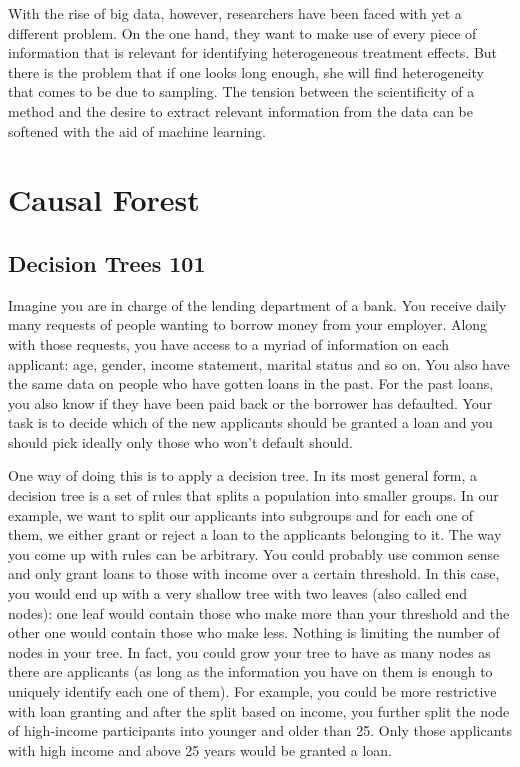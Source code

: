 With the rise of big data, however, researchers have been faced with yet a different problem. On the one hand, they want to make use of every piece of information that is relevant for identifying heterogeneous treatment effects. But there is the problem that if one looks long enough, she will find heterogeneity that comes to be due to sampling. The tension between the scientificity of a method and the desire to extract relevant information from the data can be softened with the aid of machine learning.

\newpage

\section{Causal Forest}

\subsection{Decision Trees 101}

Imagine you are in charge of the lending department of a bank. You receive daily many requests of people wanting to borrow money from your employer. Along with those requests, you have access to a myriad of information on each applicant: age, gender, income statement, marital status and so on. You also have the same data on people who have gotten loans in the past. For the past loans, you also know if they have been paid back or the borrower has defaulted. Your task is to decide which of the new applicants should be granted a loan and you should pick ideally only those who won't default should.

One way of doing this is to apply a decision tree. In its most general form, a decision tree is a set of rules that splits a population into smaller groups. In our example, we want to split our applicants into subgroups and for each one of them, we either grant or reject a loan to the applicants belonging to it. The way you come up with rules can be arbitrary. You could probably use common sense and only grant loans to those with income over a certain threshold. In this case, you would end up with a very shallow tree with two leaves (also called end nodes): one leaf would contain those who make more than your threshold and the other one would contain those who make less. Nothing is limiting the number of nodes in your tree. In fact, you could grow your tree to have as many nodes as there are applicants (as long as the information you have on them is enough to uniquely identify each one of them). For example, you could be more restrictive with loan granting and after the split based on income, you further split the node of high-income participants into younger and older than 25. Only those applicants with high income and above 25 years would be granted a loan.

